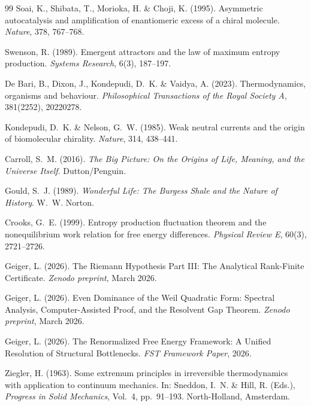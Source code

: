 \documentclass[12pt,a4paper]{article}
\theoremstyle{remark}
\begin{document}
\begin{thebibliography}{99}
Soai, K., Shibata, T., Morioka, H. \& Choji, K. (1995).
\newblock Asymmetric autocatalysis and amplification of enantiomeric excess of a chiral molecule.
\newblock \textit{Nature}, 378, 767--768.

Swenson, R. (1989).
\newblock Emergent attractors and the law of maximum entropy production.
\newblock \textit{Systems Research}, 6(3), 187--197.

De Bari, B., Dixon, J., Kondepudi, D.~K. \& Vaidya, A. (2023).
\newblock Thermodynamics, organisms and behaviour.
\newblock \textit{Philosophical Transactions of the Royal Society A}, 381(2252), 20220278.

Kondepudi, D.~K. \& Nelson, G.~W. (1985).
\newblock Weak neutral currents and the origin of biomolecular chirality.
\newblock \textit{Nature}, 314, 438--441.

Carroll, S.~M. (2016).
\newblock \textit{The Big Picture: On the Origins of Life, Meaning, and the Universe Itself}.
\newblock Dutton/Penguin.

Gould, S.~J. (1989).
\newblock \textit{Wonderful Life: The Burgess Shale and the Nature of History}.
\newblock W.~W. Norton.

Crooks, G.~E. (1999).
\newblock Entropy production fluctuation theorem and the nonequilibrium work relation for free energy differences.
\newblock \textit{Physical Review E}, 60(3), 2721--2726.

Geiger, L. (2026).
\newblock The Riemann Hypothesis Part III: The Analytical Rank-Finite Certificate.
\newblock \textit{Zenodo preprint}, March 2026.

Geiger, L. (2026).
\newblock Even Dominance of the Weil Quadratic Form: Spectral Analysis, Computer-Assisted Proof, and the Resolvent Gap Theorem.
\newblock \textit{Zenodo preprint}, March 2026.

Geiger, L. (2026).
\newblock The Renormalized Free Energy Framework: A Unified Resolution of Structural Bottlenecks.
\newblock \textit{FST Framework Paper}, 2026.

Ziegler, H. (1963).
\newblock Some extremum principles in irreversible thermodynamics with application to continuum mechanics.
\newblock In: Sneddon, I.~N. \& Hill, R. (Eds.), \textit{Progress in Solid Mechanics}, Vol.~4, pp.~91--193. North-Holland, Amsterdam.


\end{thebibliography}
\end{document}
